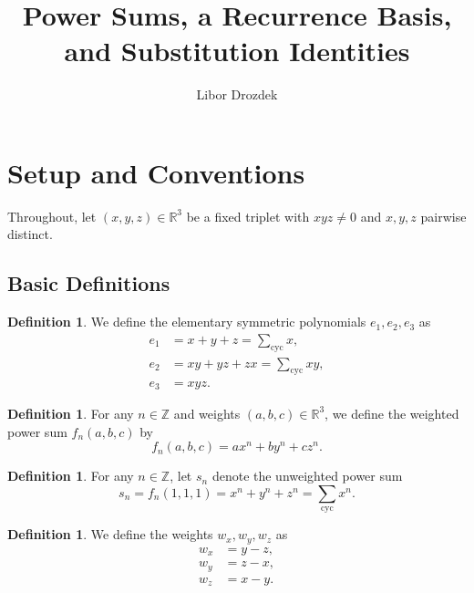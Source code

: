 \documentclass[12pt]{article}
\title{Power Sums, a Recurrence Basis, and Substitution Identities}
\author{Libor Drozdek}
\theoremstyle{definition}
\newtheorem{definition}[theorem]{Definition}
\newcommand{\cycsum}[1]{\sum_{\mathrm{cyc}}#1}
\begin{document}
	\maketitle
	\tableofcontents
	\newpage
	
	\section{Setup and Conventions}
	\label{sec:setup}
	
	Throughout, let $(x,y,z)\in\mathbb{R}^3$ be a fixed triplet with $xyz \neq 0$ and $x, y, z$ pairwise distinct.
	
	\subsection{Basic Definitions}
	
	\begin{definition}
		We define the elementary symmetric polynomials $e_1, e_2, e_3$ as
		\begin{align*}
			e_1 &= x + y + z = \cycsum{x}, \\
			e_2 &= xy + yz + zx = \cycsum{xy}, \\
			e_3 &= xyz. 
		\end{align*}
	\end{definition}
	
	\begin{definition}
		For any $n \in \mathbb{Z}$ and weights $(a, b, c) \in \mathbb{R}^3$, we define the weighted power sum $f_n(a, b, c)$ by
		\[ f_n(a, b, c) = ax^n + by^n + cz^n. \]
	\end{definition}
	
	\begin{definition}
		For any $n \in \mathbb{Z}$, let $s_n$ denote the unweighted power sum
		\[ s_n = f_n(1, 1, 1) = x^n + y^n + z^n = \cycsum{x^n}. \]
	\end{definition}
	
	\begin{definition}
		We define the weights $w_x, w_y, w_z$ as
		\begin{align*}
			w_x &= y - z, \\
			w_y &= z - x, \\
			w_z &= x - y.
		\end{align*}
	\end{definition}
	
\end{document}
